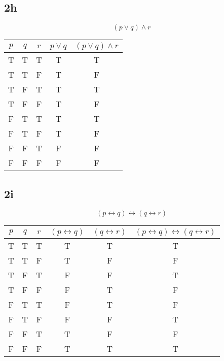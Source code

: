 \documentclass[letterpaper, 12pt]{math}
\begin{document}
\subsection*{2h}
\[ (p \vee q) \wedge r \]
\begin{center}
  \begin{tabular}{|c|c|c|c|c|}
    \hline
    \( p \) & \( q \) & \( r \) & \( p \vee q \) & \( (p \vee q) \wedge r \)
        \\ \hline
    T & T & T & T & T \\ \hline
    T & T & F & T & F \\ \hline
    T & F & T & T & T \\ \hline
    T & F & F & T & F \\ \hline
    F & T & T & T & T \\ \hline
    F & T & F & T & F \\ \hline
    F & F & T & F & F \\ \hline
    F & F & F & F & F \\ \hline
  \end{tabular}
\end{center}

\subsection*{2i}
\[ (p \leftrightarrow q) \leftrightarrow (q \leftrightarrow r) \]
\begin{center}
  \begin{tabular}{|c|c|c|c|c|c|}
    \hline
    \( p \) & \( q \) & \( r \) & \( (p \leftrightarrow q) \) &
    \( (q \leftrightarrow r) \) &
    \( (p \leftrightarrow q) \leftrightarrow (q \leftrightarrow r) \) \\ \hline
    T & T & T & T & T & T \\ \hline
    T & T & F & T & F & F \\ \hline
    T & F & T & F & F & T \\ \hline
    T & F & F & F & T & F \\ \hline
    F & T & T & F & T & F \\ \hline
    F & T & F & F & F & T \\ \hline
    F & F & T & T & F & F \\ \hline
    F & F & F & T & T & T \\ \hline
  \end{tabular}
\end{center}
\end{document}

